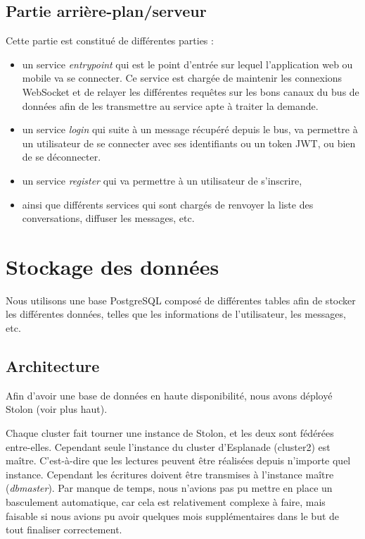 \subsection{Partie arrière-plan/serveur}

Cette partie est constitué de différentes parties :

\begin{itemize}
\item
  un service \textit{entrypoint} qui est le point d'entrée sur lequel
  l'application web ou mobile va se connecter. Ce service est chargée de
  maintenir les connexions WebSocket et de relayer les différentes
  requêtes sur les bons canaux du bus de données afin de les transmettre
  au service apte à traiter la demande.
\item
  un service \textit{login} qui suite à un message récupéré depuis le bus,
  va permettre à un utilisateur de se connecter avec ses identifiants ou
  un token JWT, ou bien de se déconnecter.
\item
  un service \textit{register} qui va permettre à un utilisateur de
  s'inscrire,
\item
  ainsi que différents services qui sont chargés de renvoyer la liste
  des conversations, diffuser les messages, etc.
\end{itemize}

\section{Stockage des données}

Nous utilisons une base PostgreSQL composé de différentes tables afin de
stocker les différentes données, telles que les informations de
l'utilisateur, les messages, etc.


\subsection{Architecture}

Afin d'avoir une base de données en haute disponibilité, nous avons
déployé Stolon (voir plus haut).

Chaque cluster fait tourner une instance de Stolon, et les deux sont
fédérées entre-elles. Cependant seule l'instance du cluster d'Esplanade
(cluster2) est maître. C'est-à-dire que les lectures peuvent être
réalisées depuis n'importe quel instance. Cependant les écritures
doivent être transmises à l'instance maître (\textit{dbmaster}). Par
manque de temps, nous n'avions pas pu mettre en place un basculement
automatique, car cela est relativement complexe à faire, mais faisable
si nous avions pu avoir quelques mois supplémentaires dans le but de
tout finaliser correctement.

